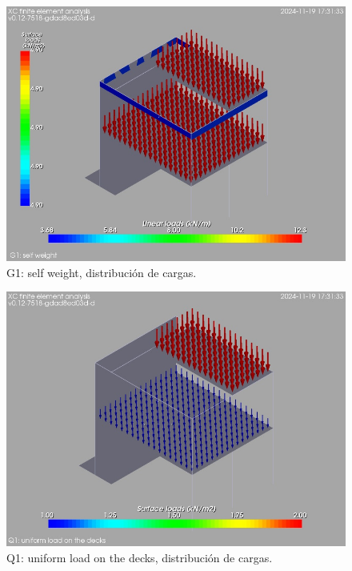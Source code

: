 \begin{figure}[ht]
\begin{center}
\includegraphics[width=\linewidth]{results/graphics/loads/GselfWeightoverallSet}
\caption{ G1: self weight, distribución de cargas.}
\label{GselfWeightoverallSet}
\end{center}
\end{figure}
\begin{figure}[ht]
\begin{center}
\includegraphics[width=\linewidth]{results/graphics/loads/QdecksoverallSet}
\caption{Q1: uniform load on the decks, distribución de cargas.}
\label{QdecksoverallSet}
\end{center}
\end{figure}
